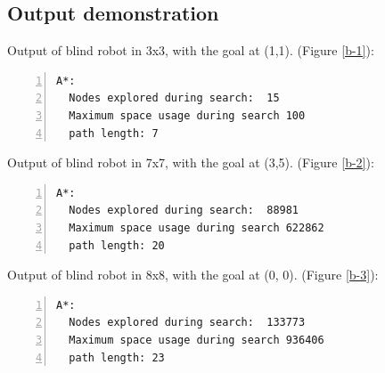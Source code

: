 \documentclass{article}
\begin{document}
\subsection{Output demonstration}

Output of blind robot in 3x3, with the goal at (1,1). (Figure \ref{b-1}):
\begin{lstlisting}[numbers=left]
A*:  
  Nodes explored during search:  15
  Maximum space usage during search 100
  path length: 7
\end{lstlisting}

Output of blind robot in 7x7, with the goal at (3,5). (Figure \ref{b-2}):
\begin{lstlisting}[numbers=left]
A*: 
  Nodes explored during search:  88981
  Maximum space usage during search 622862
  path length: 20
\end{lstlisting}

Output of blind robot in 8x8, with the goal at (0, 0). (Figure \ref{b-3}):
\begin{lstlisting}[numbers=left]
A*: 
  Nodes explored during search:  133773
  Maximum space usage during search 936406
  path length: 23
\end{lstlisting}
\end{document}
